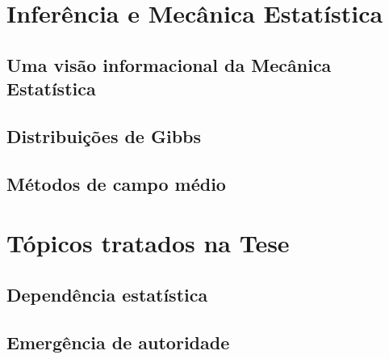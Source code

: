 \section{Inferência e Mecânica Estatística}
\subsection{Uma visão informacional da Mecânica Estatística}
\subsection{Distribuições de Gibbs}
\subsection{Métodos de campo médio}

\section{Tópicos tratados na Tese}
\subsection{Dependência estatística}
\subsection{Emergência de autoridade}